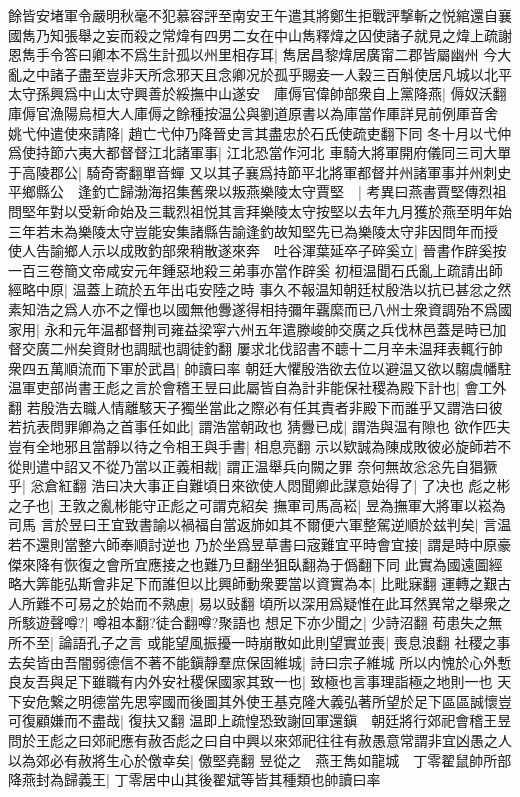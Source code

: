 餘皆安堵軍令嚴明秋毫不犯慕容評至南安王午遣其將鄭生拒戰評撃斬之悦綰還自襄國雋乃知張舉之妄而殺之常煒有四男二女在中山雋釋煒之囚使諸子就見之煒上疏謝恩雋手令答曰卿本不爲生計孤以州里相存耳|{
	雋居昌黎煒居廣甯二郡皆屬幽州}
今大亂之中諸子盡至豈非天所念邪天且念卿况於孤乎賜妾一人穀三百斛使居凡城以北平太守孫興爲中山太守興善於綏撫中山遂安　庫傉官偉帥部衆自上黨降燕|{
	傉奴沃翻庫傉官漁陽烏桓大人庫傉之餘種按温公與劉道原書以為庫當作厙詳見前例厙音舍}
姚弋仲遣使來請降|{
	趙亡弋仲乃降晉史言其盡忠於石氏使疏吏翻下同}
冬十月以弋仲爲使持節六夷大都督督江北諸軍事|{
	江北恐當作河北}
車騎大將軍開府儀同三司大單于高陵郡公|{
	騎奇寄翻單音蟬}
又以其子襄爲持節平北將軍都督并州諸軍事并州刺史平鄉縣公　逢釣亡歸渤海招集舊衆以叛燕樂陵太守賈堅　|{
	考異曰燕書賈堅傳烈祖問堅年對以受新命始及三載烈祖悦其言拜樂陵太守按堅以去年九月獲於燕至明年始三年若未為樂陵太守豈能安集諸縣告諭逢釣故知堅先已為樂陵太守非因問年而授}
使人告諭鄉人示以成敗釣部衆稍散遂來奔　吐谷渾葉延卒子碎奚立|{
	晉書作辟奚按一百三卷簡文帝咸安元年鍾惡地殺三弟事亦當作辟奚}
初桓温聞石氏亂上疏請出師經略中原|{
	温蓋上疏於五年出屯安陸之時}
事久不報温知朝廷杖殷浩以抗已甚忿之然素知浩之爲人亦不之憚也以國無他釁遂得相持彌年覊縻而已八州士衆資調殆不爲國家用|{
	永和元年温都督荆司雍益梁寜六州五年遣滕峻帥交廣之兵伐林邑蓋是時已加督交廣二州矣資財也調賦也調徒釣翻}
屢求北伐詔書不聼十二月辛未温拜表輒行帥衆四五萬順流而下軍於武昌|{
	帥讀曰率}
朝廷大懼殷浩欲去位以避温又欲以騶虞幡駐温軍吏部尚書王彪之言於會稽王昱曰此屬皆自為計非能保社稷為殿下計也|{
	會工外翻}
若殷浩去職人情離駭天子獨坐當此之際必有任其責者非殿下而誰乎又謂浩曰彼若抗表問罪卿為之首事任如此|{
	謂浩當朝政也}
猜釁已成|{
	謂浩與温有隙也}
欲作匹夫豈有全地邪且當靜以待之令相王與手書|{
	相息亮翻}
示以欵誠為陳成敗彼必旋師若不從則遣中詔又不從乃當以正義相裁|{
	謂正温舉兵向闕之罪}
奈何無故忩忩先自猖獗乎|{
	忩倉紅翻}
浩曰决大事正自難頃日來欲使人悶聞卿此謀意始得了|{
	了决也}
彪之彬之子也|{
	王敦之亂彬能守正彪之可謂克紹矣}
撫軍司馬高崧|{
	昱為撫軍大將軍以崧為司馬}
言於昱曰王宜致書諭以禍福自當返斾如其不爾便六軍整駕逆順於兹判矣|{
	言温若不還則當整六師奉順討逆也}
乃於坐爲昱草書曰宼難宜平時會宜接|{
	謂是時中原豪傑來降有恢復之會所宜應接之也難乃旦翻坐狙臥翻為于僞翻下同}
此實為國遠圖經略大筭能弘斯會非足下而誰但以比興師動衆要當以資實為本|{
	比毗寐翻}
運轉之艱古人所難不可易之於始而不熟慮|{
	易以䜴翻}
頃所以深用爲疑惟在此耳然異常之舉衆之所駭遊聲噂?|{
	噂祖本翻?徒合翻噂?聚語也}
想足下亦少聞之|{
	少詩沼翻}
苟患失之無所不至|{
	論語孔子之言}
或能望風振擾一時崩散如此則望實並喪|{
	喪息浪翻}
社稷之事去矣皆由吾闇弱德信不著不能鎭靜羣庶保固維城|{
	詩曰宗子維城}
所以内愧於心外慙良友吾與足下雖職有内外安社稷保國家其致一也|{
	致極也言事理詣極之地則一也}
天下安危繋之明德當先思寜國而後圖其外使王基克隆大義弘著所望於足下區區誠懷豈可復顧嫌而不盡哉|{
	復扶又翻}
温即上疏惶恐致謝回軍還鎭　朝廷將行郊祀會稽王昱問於王彪之曰郊祀應有赦否彪之曰自中興以來郊祀往往有赦愚意常謂非宜凶愚之人以為郊必有赦將生心於儌幸矣|{
	儌堅堯翻}
昱從之　燕王雋如龍城　丁零翟鼠帥所部降燕封為歸義王|{
	丁零居中山其後翟斌等皆其種類也帥讀曰率}


